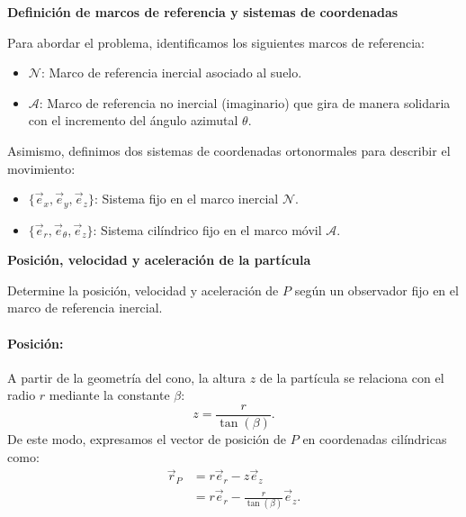 \begin{tcolorbox}[title=Arbol de Navidad(pero sin condicion de R y $\theta$),breakable]
\vspace{0.8em}
\noindent\textbf{Definición de marcos de referencia y sistemas de coordenadas}

Para abordar el problema, identificamos los siguientes marcos de referencia:
\begin{itemize}
    \item $\mathcal{N}$: Marco de referencia inercial asociado al suelo.
    \item $\mathcal{A}$: Marco de referencia no inercial (imaginario) que gira de manera solidaria con el incremento del ángulo azimutal $\theta$.
\end{itemize}

Asimismo, definimos dos sistemas de coordenadas ortonormales para describir el movimiento:
\begin{itemize}
    \item $\{ \vec{e}_x, \vec{e}_y, \vec{e}_z \}$: Sistema fijo en el marco inercial $\mathcal{N}$.
    \item $\{ \vec{e}_r, \vec{e}_{\theta}, \vec{e}_z \}$: Sistema cilíndrico fijo en el marco móvil $\mathcal{A}$.
\end{itemize}

\vspace{0.8em}
\noindent\textbf{Posición, velocidad y aceleración de la partícula}

 Determine la posición, velocidad y aceleración de $P$ según un observador fijo en el marco de referencia inercial.

\paragraph{Posición:} A partir de la geometría del cono, la altura $z$ de la partícula se relaciona con el radio $r$ mediante la constante $\beta$:
\[
    z = \frac{r}{\tan(\beta)}.
\]
De este modo, expresamos el vector de posición de $P$ en coordenadas cilíndricas como:
\begin{align*}
    \vec{r}_P &= r\vec{e}_{r} - z\vec{e}_z \\
              &= r\vec{e}_{r} - \frac{r}{\tan(\beta)} \vec{e}_z.
\end{align*}


\end{tcolorbox}
